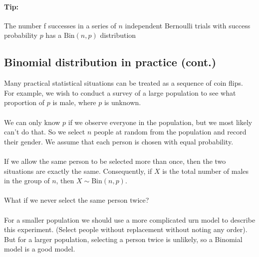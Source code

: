 \documentclass{report}
\theoremstyle{definition}
\theoremstyle{plain}
\newtheorem{theorem}{Theorem}
\theoremstyle{remark}
\begin{document}
\paragraph{Tip:}
The number f successes in a series of $ n $ independent Bernoulli trials with
success probability $ p $ has a $ \text{Bin}(n,p) $ distribution

\begin{center}
\end{center}

\subsection{Binomial distribution in practice (cont.)}
Many practical statistical situations can be treated as a sequence of coin
flips. For example, we wish to conduct a survey of a large population to see
what proportion of $ p $ is male, where $ p $ is unknown.
\\\\
We can only know $ p $ if we observe everyone in the population, but we most
likely can't do that. So we select $ n $ people at random from the population
and record their gender. We assume that each person is chosen with equal
probability. 
\\\\
If we allow the same person to be selected more than once, then the two
situations are exactly the same. Consequently, if $ X $ is the total number of
males in the group of $ n $, then $ X \sim \text{Bin}(n,p) $.
\\\\
What if we never select the same person twice?
\\\\
For a smaller population we should use a more complicated urn model to describe
this experiment. (Select people without replacement without noting any order).
But for a larger population, selecting a person twice is unlikely, so
a Binomial model is a good model.
\end{document}
